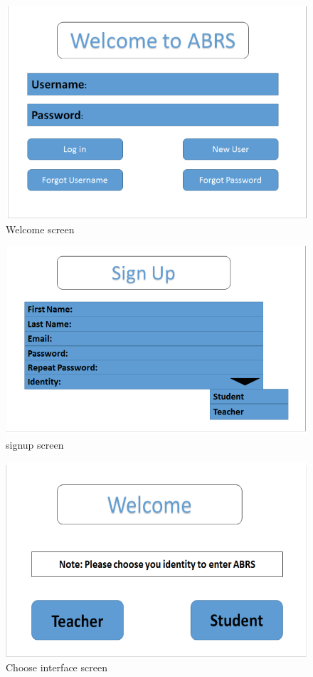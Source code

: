 \documentclass[12pt]{article}
\begin{document}
\begin{figure}[h]
	\caption{Welcome screen}
\includegraphics[width=\textwidth]{img/3} 
\end{figure}
\begin{figure}[h]
	\caption{signup screen}
\includegraphics[width=\textwidth]{img/4} 
\end{figure}
\begin{figure}
	\caption{Choose interface screen}
\includegraphics[width=\textwidth]{img/5} 
\end{figure}
\end{document}
